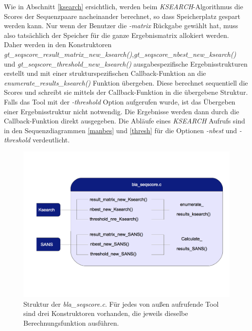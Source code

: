 \documentclass{article}
\begin{document}
Wie in Abschnitt \ref{ksearch} ersichtlich, werden beim \emph{KSEARCH}-Algorithmus die Scores der Sequenzpaare nacheinander berechnet, so dass Speicherplatz gespart werden kann. Nur wenn der Benutzer die \emph{-matrix} Rückgabe gewählt hat, muss also tatsächlich der Speicher für die ganze Ergebnismatrix allokiert werden. Daher werden in den Konstruktoren \emph{gt\_seqscore\_result\_matrix\_new\_ksearch()},\linebreak \emph{gt\_seqscore\_nbest\_new\_ksearch()} und  \emph{gt\_seqscore\_threshold\_new\_ksearch()} ausgabespezifische Ergebnisstrukturen erstellt und mit einer strukturspezifischen Call\-back-Funktion an 
die \emph{enumerate\_results\_ksearch()} Funktion übergeben. Diese berechnet sequentiell die Scores und schreibt sie mittels der Callback-Funktion in die übergebene Struktur. Falls das Tool mit der \emph{-threshold} Option aufgerufen wurde, ist das Übergeben einer Ergebnisstruktur nicht notwendig. Die Ergebnisse werden dann durch die Callback-Funktion direkt ausgegeben. Die Abläufe eines \emph{KSEARCH} Aufrufs sind in den Sequenzdiagrammen \ref{manbes} und \ref{thresh} für die Optionen \emph{-nbest} und \emph{-threshold} verdeutlicht. \\

\begin{center}
  \begin{figure}
    \includegraphics[width = \linewidth]{img/dia2}
    \caption{Struktur der \emph{bla\_seqscore.c}. Für jedes von außen aufrufende Tool sind drei Konstruktoren vorhanden, die jeweils dieselbe Berechnungsfunktion ausführen.}
    \label{seqsc}
  \end{figure}
\end{center}
\end{document}
